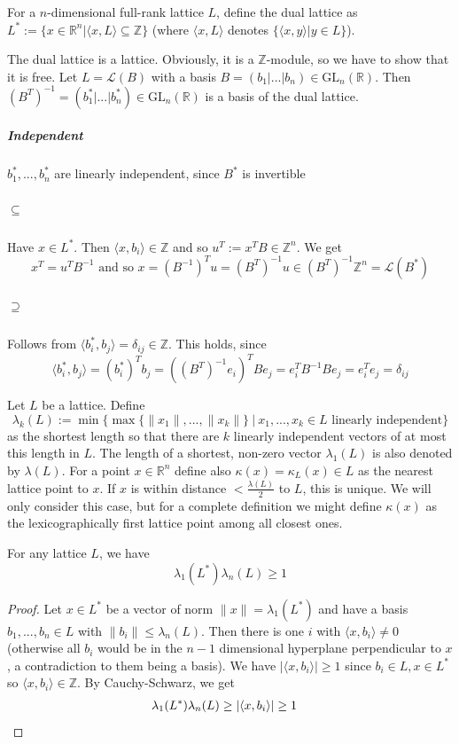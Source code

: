 \documentclass{report}
\newcommand{\Z}{\mathbb{Z}}
\newcommand{\R}{\mathbb{R}}
\begin{document}
For a $n$-dimensional full-rank lattice $L$, define the dual lattice as $L^* := \{ x \in \R^n | \langle x, L \rangle \subseteq \Z \}$ (where $\langle x, L \rangle$ denotes $\{\langle x, y \rangle|y \in L\}$).

\remark
The dual lattice is a lattice. Obviously, it is a $\Z$-module, so we have to show that it is free. Let $L = \mathcal{L}(B)$ with a basis $B = (b_1|...|b_n) \in \text{GL}_n(\R)$. Then $(B^T)^{-1} = (b_1^*|...|b_n^*) \in \text{GL}_n(\R)$ is a basis of the dual lattice.
\subparagraph{Independent} $b_1^*, ..., b_n^*$ are linearly independent, since $B^*$ is invertible
\subparagraph{$\subseteq$} Have $x \in L^*$. Then $\langle x, b_i \rangle \in \Z$ and so $u^T := x^T B \in \Z^n$. We get
\begin{equation}
x^T = u^T B^{-1} \text{ and so } x = \left(B^{-1}\right)^T u = \left(B^T\right)^{-1} u \in  \left(B^T\right)^{-1} \Z^n = \mathcal{L}\left(B^*\right) \nonumber
\end{equation}
\subparagraph{$\supseteq$} Follows from $\langle b_i^*, b_j \rangle = \delta_{ij} \in \Z$. This holds, since 
\begin{equation}
\langle b_i^*, b_j \rangle = \left(b_i^*\right)^T b_j = \left(\left(B^T\right)^{-1}e_i\right)^TBe_j = e_i^T B^{-1}Be_j = e_i^Te_j = \delta_{ij}  \nonumber
\end{equation}

Let $L$ be a lattice. Define 
\begin{equation}
\lambda_k(L) := \min \{ \max \{ \|x_1\|, ..., \|x_k\| \} \ | \ x_1, ..., x_k \in L \text{ linearly independent} \} \nonumber
\end{equation}
as the shortest length so that there are $k$ linearly independent vectors of at most this length in $L$. The length of a shortest, non-zero vector $\lambda_1(L)$ is also denoted by $\lambda(L)$. For a point $x \in \R^n$ define also $\kappa(x) = \kappa_L(x) \in L$ as the nearest lattice point to $x$. If $x$ is within distance $< \frac {\lambda(L)} 2$ to $L$, this is unique. We will only consider this case, but for a complete definition we might define $\kappa(x)$ as the lexicographically first lattice point among all closest ones.

\lemma
\label{lambda_dual_lattice}
For any lattice $L$, we have
\begin{equation}
\lambda_1(L^*)\lambda_n(L) \geq 1 \nonumber
\end{equation}

\begin{proof}
Let $x \in L^*$ be a vector of norm $\| x \| = \lambda_1(L^*)$ and have a basis $b_1, ..., b_n \in L$ with $\| b_i \| \leq \lambda_n(L)$. Then there is one $i$ with $\langle x, b_i \rangle \neq 0$ (otherwise all $b_i$ would be in the $n-1$ dimensional hyperplane perpendicular to $x$, a contradiction to them being a basis). We have $| \langle x, b_i \rangle | \geq 1$ since $b_i \in L, x \in L^*$ so $\langle x, b_i \rangle \in \Z$. By Cauchy-Schwarz, we get
\begin{align*}
\lambda_1(L^*)\lambda_n(L) \geq |\langle x, b_i \rangle| \geq 1 & \qedhere
\end{align*}
\end{proof}
\end{document}
